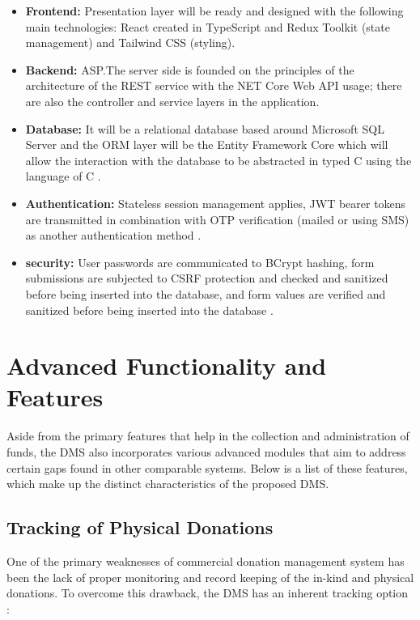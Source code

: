 \documentclass{thesis-library}
\begin{document}
\begin{itemize}
    \item \textbf{Frontend:} Presentation layer will be ready and designed with the following main technologies: React created in TypeScript and Redux Toolkit (state management) and Tailwind CSS (styling).
    \item \textbf{Backend:} ASP.The server side is founded on the principles of the architecture of the REST service with the NET Core Web API usage; there are also the controller and service layers in the application.
    \item \textbf{Database:} It will be a relational database based around Microsoft SQL Server and the ORM layer will be the Entity Framework Core which will allow the interaction with the database to be abstracted in typed C using the language of C \cite{coronel2016database}.
    \item \textbf{Authentication:} Stateless session management applies, JWT bearer tokens are transmitted in combination with OTP verification (mailed or using SMS) as another authentication method \cite{suoranta2019otp,jones2015jwt}.
    \item \textbf{security:} User passwords are communicated to BCrypt hashing, form submissions are subjected to CSRF protection and checked and sanitized before being inserted into the database, and form values are verified and sanitized before being inserted into the database \cite{owasp2021top10}.
\end{itemize}

\section{Advanced Functionality and Features}

Aside from the primary features that help in the collection and administration of funds, the DMS also incorporates various advanced modules that aim to address certain gaps found in other comparable systems. Below is a list of these features, which make up the distinct characteristics of the proposed DMS.

\subsection{Tracking of Physical Donations}

One of the primary weaknesses of commercial donation management system has been the lack of proper monitoring and record keeping of the in-kind and physical donations. To overcome this drawback, the DMS has an inherent tracking option \cite{kalinda2022university}:
\end{document}
